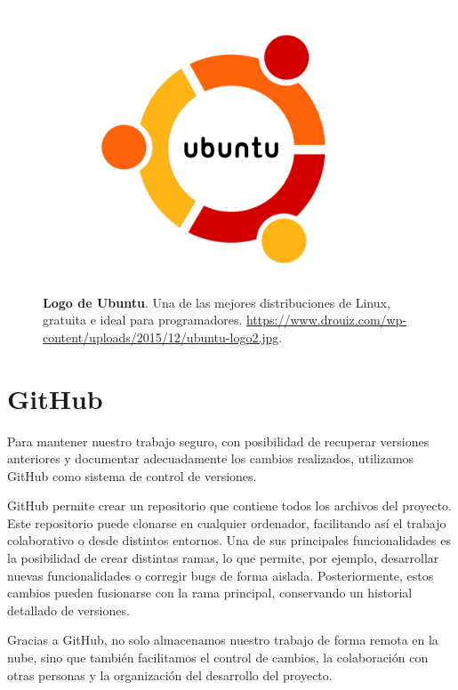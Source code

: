 \begin{figure}[H]
    \centering
    \includegraphics[width=1\linewidth]{imagenes/ubuntuLogo.jpg}
    \caption[\textbf{Logo de Ubuntu}.]{\textbf{Logo de Ubuntu}. Una de las mejores distribuciones de Linux, gratuita e ideal para programadores. \href{https://www.drouiz.com/wp-content/uploads/2015/12/ubuntu-logo2.jpg}{https://www.drouiz.com/wp-content/uploads/2015/12/ubuntu-logo2.jpg}.}
    \label{logo-ubuntu}
\end{figure}

\newpage


\section{GitHub}

Para mantener nuestro trabajo seguro, con posibilidad de recuperar versiones anteriores y documentar adecuadamente los cambios realizados, utilizamos GitHub como sistema de control de versiones.

GitHub permite crear un repositorio que contiene todos los archivos del proyecto. Este repositorio puede clonarse en cualquier ordenador, facilitando así el trabajo colaborativo o desde distintos entornos. Una de sus principales funcionalidades es la posibilidad de crear distintas ramas, lo que permite, por ejemplo, desarrollar nuevas funcionalidades o corregir bugs de forma aislada. Posteriormente, estos cambios pueden fusionarse con la rama principal, conservando un historial detallado de versiones.

Gracias a GitHub, no solo almacenamos nuestro trabajo de forma remota en la nube, sino que también facilitamos el control de cambios, la colaboración con otras personas y la organización del desarrollo del proyecto.

